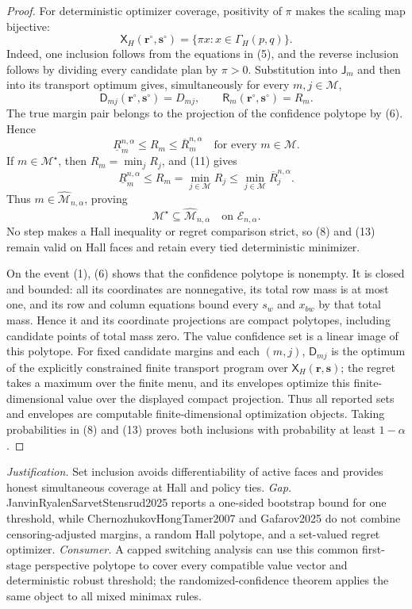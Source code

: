\documentclass{article}
\begin{document}
\begin{proof}
For deterministic optimizer coverage, positivity of \(\pi\) makes the scaling map bijective:
\[
 \mathsf X_H(\mathbf r^\circ,\mathbf s^\circ)
 =\{\pi x:x\in\Gamma_H(p,q)\}.                          \tag{9}
\]
Indeed, one inclusion follows from the equations in (5), and the reverse inclusion follows by dividing every candidate plan by \(\pi>0\).  Substitution into \(\mathsf J_m\) and then into its transport optimum gives, simultaneously for every \(m,j\in\mathcal M\),
\[
 \mathsf D_{mj}(\mathbf r^\circ,\mathbf s^\circ)=D_{mj},
 \qquad
 \mathsf R_m(\mathbf r^\circ,\mathbf s^\circ)=R_m.       \tag{10}
\]
The true margin pair belongs to the projection of the confidence polytope by (6).  Hence
\[
 \underline R_m^{n,\alpha}\le R_m\le\overline R_m^{n,\alpha}
 \quad\text{for every }m\in\mathcal M.                  \tag{11}
\]
If \(m\in\mathcal M^\star\), then \(R_m=\min_jR_j\), and (11) gives
\[
 \underline R_m^{n,\alpha}
 \le R_m
 =\min_{j\in\mathcal M}R_j
 \le\min_{j\in\mathcal M}\overline R_j^{n,\alpha}.     \tag{12}
\]
Thus \(m\in\widehat{\mathcal M}_{n,\alpha}\), proving
\[
 \mathcal M^\star\subseteq\widehat{\mathcal M}_{n,\alpha}
 \quad\text{on }\mathcal E_{n,\alpha}.                  \tag{13}
\]
No step makes a Hall inequality or regret comparison strict, so (8) and (13) remain valid on Hall faces and retain every tied deterministic minimizer.

On the event (1), (6) shows that the confidence polytope is nonempty.  It is closed and bounded: all its coordinates are nonnegative, its total row mass is at most one, and its row and column equations bound every \(s_w\) and \(x_{bw}\) by that total mass.  Hence it and its coordinate projections are compact polytopes, including candidate points of total mass zero.  The value confidence set is a linear image of this polytope.  For fixed candidate margins and each \((m,j)\), \(\mathsf D_{mj}\) is the optimum of the explicitly constrained finite transport program over \(\mathsf X_H(\mathbf r,\mathbf s)\); the regret takes a maximum over the finite menu, and its envelopes optimize this finite-dimensional value over the displayed compact projection.  Thus all reported sets and envelopes are computable finite-dimensional optimization objects.  Taking probabilities in (8) and (13) proves both inclusions with probability at least \(1-\alpha\).
\end{proof}
\par\smallskip\noindent \textit{Justification.} Set inclusion avoids differentiability of active faces and provides honest simultaneous coverage at Hall and policy ties. \textit{Gap.} JanvinRyalenSarvetStensrud2025 reports a one-sided bootstrap bound for one threshold, while ChernozhukovHongTamer2007 and Gafarov2025 do not combine censoring-adjusted margins, a random Hall polytope, and a set-valued regret optimizer. \textit{Consumer.} A capped switching analysis can use this common first-stage perspective polytope to cover every compatible value vector and deterministic robust threshold; the randomized-confidence theorem applies the same object to all mixed minimax rules.
\end{document}
